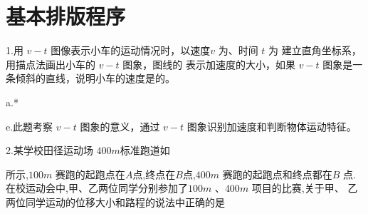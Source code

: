 \documentclass[a4paper,fontset = windows]{ctexbook}
\begin{document}
\chapter{基本排版程序}

 \begin{judgements}
  1.用 $v-t$ 图像表示小车的运动情况时，以速度$v$ 为、时间 $t$ 为 建立直角坐标系，用描点法画出小车的 $v-t$ 图象，图线的  表示加速度的大小，如果 $v-t$ 图象是一条倾斜的直线，说明小车的速度是的。
 
 a.*
 
 e.此题考察 $v-t$ 图象的意义，通过 $v-t$ 图象识别加速度和判断物体运动特征。

 2.某学校田径运动场 $400m$标准跑道如
 所示,$100m$ 赛跑的起跑点在$A$点,终点在$B$点,$400m$ 赛跑的起跑点和终点都在$B$ 点.在校运动会中,甲、乙两位同学分别参加了$100m$ 、$400m$ 项目的比赛,关于甲、
 乙两位同学运动的位移大小和路程的说法中正确的是

 \end{judgements}
\end{document}
